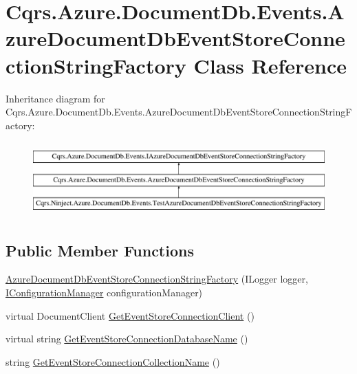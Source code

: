 \hypertarget{classCqrs_1_1Azure_1_1DocumentDb_1_1Events_1_1AzureDocumentDbEventStoreConnectionStringFactory}{}\section{Cqrs.\+Azure.\+Document\+Db.\+Events.\+Azure\+Document\+Db\+Event\+Store\+Connection\+String\+Factory Class Reference}
\label{classCqrs_1_1Azure_1_1DocumentDb_1_1Events_1_1AzureDocumentDbEventStoreConnectionStringFactory}
Inheritance diagram for Cqrs.\+Azure.\+Document\+Db.\+Events.\+Azure\+Document\+Db\+Event\+Store\+Connection\+String\+Factory\+:\begin{figure}[H]
\begin{center}
\leavevmode
\includegraphics[height=2.891566cm]{classCqrs_1_1Azure_1_1DocumentDb_1_1Events_1_1AzureDocumentDbEventStoreConnectionStringFactory}
\end{center}
\end{figure}
\subsection*{Public Member Functions}
\begin{DoxyCompactItemize}
\item 
\hyperlink{classCqrs_1_1Azure_1_1DocumentDb_1_1Events_1_1AzureDocumentDbEventStoreConnectionStringFactory_a7503e00bedc6af5686ded0b6b7719a30_a7503e00bedc6af5686ded0b6b7719a30}{Azure\+Document\+Db\+Event\+Store\+Connection\+String\+Factory} (I\+Logger logger, \hyperlink{interfaceCqrs_1_1Configuration_1_1IConfigurationManager}{I\+Configuration\+Manager} configuration\+Manager)
\item 
virtual Document\+Client \hyperlink{classCqrs_1_1Azure_1_1DocumentDb_1_1Events_1_1AzureDocumentDbEventStoreConnectionStringFactory_ad221f74db207af105beae4fcb4908db7_ad221f74db207af105beae4fcb4908db7}{Get\+Event\+Store\+Connection\+Client} ()
\item 
virtual string \hyperlink{classCqrs_1_1Azure_1_1DocumentDb_1_1Events_1_1AzureDocumentDbEventStoreConnectionStringFactory_af243f79315140e1f2c20a5c1695f4fb9_af243f79315140e1f2c20a5c1695f4fb9}{Get\+Event\+Store\+Connection\+Database\+Name} ()
\item 
string \hyperlink{classCqrs_1_1Azure_1_1DocumentDb_1_1Events_1_1AzureDocumentDbEventStoreConnectionStringFactory_a47a2b2315a2ca8daa9355530a241c133_a47a2b2315a2ca8daa9355530a241c133}{Get\+Event\+Store\+Connection\+Collection\+Name} ()
\end{DoxyCompactItemize}
